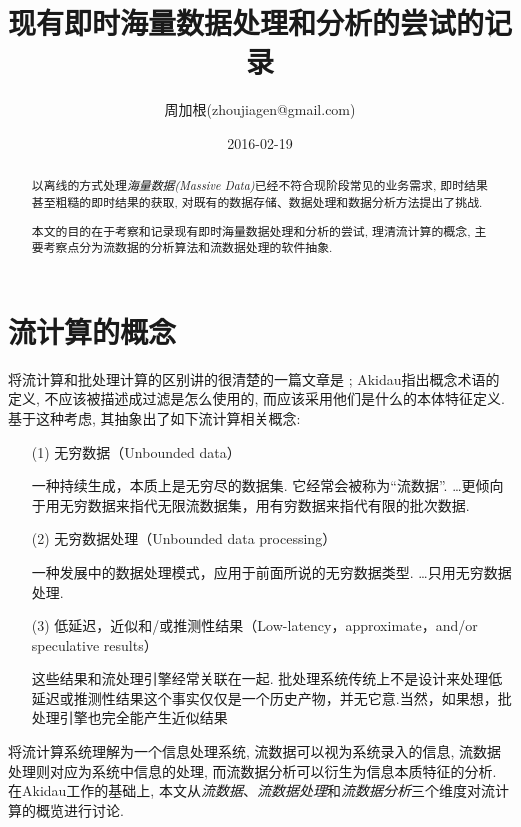 \documentclass{article}
\title{现有即时海量数据处理和分析的尝试的记录}
\author{周加根(zhoujiagen@gmail.com)}
\date{2016-02-19}
\begin{document}
\maketitle

\renewcommand\abstractname{简述}  
\begin{abstract}
\setlength{\parskip}{0.5em} %

以离线的方式处理\emph{海量数据(Massive Data)}已经不符合现阶段常见的业务需求, 即时结果甚至粗糙的即时结果的获取, 对既有的数据存储、数据处理和数据分析方法提出了挑战.

本文的目的在于考察和记录现有即时海量数据处理和分析的尝试, 理清流计算的概念, 主要考察点分为流数据的分析算法和流数据处理的软件抽象.
\end{abstract}  

\newpage

\renewcommand\contentsname{目录}  
\tableofcontents  

\newpage 

\section{流计算的概念}

将流计算和批处理计算的区别讲的很清楚的一篇文章是\cite{stream-computing101} ; Akidau指出概念术语的定义, 不应该被描述成过滤是怎么使用的, 而应该采用他们是什么的本体特征定义. 基于这种考虑, 其抽象出了如下流计算相关概念: 

\begin{enumerate}
\item[(1)] 无穷数据（Unbounded data）

一种持续生成，本质上是无穷尽的数据集. 它经常会被称为“流数据”. \dots 更倾向于用无穷数据来指代无限流数据集，用有穷数据来指代有限的批次数据.

\item[(2)] 无穷数据处理（Unbounded data processing）

一种发展中的数据处理模式，应用于前面所说的无穷数据类型. \dots 只用无穷数据处理.

\item[(3)] 低延迟，近似和/或推测性结果（Low-latency，approximate，and/or speculative results）

这些结果和流处理引擎经常关联在一起. 批处理系统传统上不是设计来处理低延迟或推测性结果这个事实仅仅是一个历史产物，并无它意.当然，如果想，批处理引擎也完全能产生近似结果 
\end{enumerate}

将流计算系统理解为一个信息处理系统, 流数据可以视为系统录入的信息, 流数据处理则对应为系统中信息的处理, 而流数据分析可以衍生为信息本质特征的分析. 在Akidau工作的基础上, 本文从\emph{流数据}、\emph{流数据处理}和\emph{流数据分析}三个维度对流计算的概览进行讨论.
\end{document}
